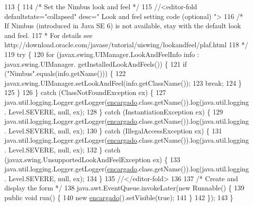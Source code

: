 \begin{DoxyCode}
113                                            \{
114         \textcolor{comment}{/* Set the Nimbus look and feel */}
115         \textcolor{comment}{//<editor-fold defaultstate="collapsed" desc=" Look and feel setting code (optional) ">}
116         \textcolor{comment}{/* If Nimbus (introduced in Java SE 6) is not available, stay with the default look and feel.}
117 \textcolor{comment}{         * For details see http://download.oracle.com/javase/tutorial/uiswing/lookandfeel/plaf.html }
118 \textcolor{comment}{         */}
119         \textcolor{keywordflow}{try} \{
120             \textcolor{keywordflow}{for} (javax.swing.UIManager.LookAndFeelInfo info : javax.swing.UIManager.
      getInstalledLookAndFeels()) \{
121                 \textcolor{keywordflow}{if} (\textcolor{stringliteral}{"Nimbus"}.equals(info.getName())) \{
122                     javax.swing.UIManager.setLookAndFeel(info.getClassName());
123                     \textcolor{keywordflow}{break};
124                 \}
125             \}
126         \} \textcolor{keywordflow}{catch} (ClassNotFoundException ex) \{
127             java.util.logging.Logger.getLogger(\mbox{\hyperlink{classinterfacessoguar_1_1encargado_a7ddc5de97eb0929c44ecc46246a58a32}{encargado}}.class.getName()).log(java.util.logging.
      Level.SEVERE, null, ex);
128         \} \textcolor{keywordflow}{catch} (InstantiationException ex) \{
129             java.util.logging.Logger.getLogger(\mbox{\hyperlink{classinterfacessoguar_1_1encargado_a7ddc5de97eb0929c44ecc46246a58a32}{encargado}}.class.getName()).log(java.util.logging.
      Level.SEVERE, null, ex);
130         \} \textcolor{keywordflow}{catch} (IllegalAccessException ex) \{
131             java.util.logging.Logger.getLogger(\mbox{\hyperlink{classinterfacessoguar_1_1encargado_a7ddc5de97eb0929c44ecc46246a58a32}{encargado}}.class.getName()).log(java.util.logging.
      Level.SEVERE, null, ex);
132         \} \textcolor{keywordflow}{catch} (javax.swing.UnsupportedLookAndFeelException ex) \{
133             java.util.logging.Logger.getLogger(\mbox{\hyperlink{classinterfacessoguar_1_1encargado_a7ddc5de97eb0929c44ecc46246a58a32}{encargado}}.class.getName()).log(java.util.logging.
      Level.SEVERE, null, ex);
134         \}
135         \textcolor{comment}{//</editor-fold>}
136 
137         \textcolor{comment}{/* Create and display the form */}
138         java.awt.EventQueue.invokeLater(\textcolor{keyword}{new} Runnable() \{
139             \textcolor{keyword}{public} \textcolor{keywordtype}{void} run() \{
140                 \textcolor{keyword}{new} \mbox{\hyperlink{classinterfacessoguar_1_1encargado_a7ddc5de97eb0929c44ecc46246a58a32}{encargado}}().setVisible(\textcolor{keyword}{true});
141             \}
142         \});
143     \}
\end{DoxyCode}


